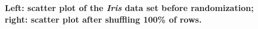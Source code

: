 \begin{figure}[h]
    \caption{\textbf{\textsf{Left: scatter plot of the \textit{Iris} data set before randomization; right: scatter plot after shuffling 100\% of rows.}}}
\end{figure}

